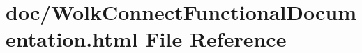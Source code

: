 \hypertarget{_wolk_connect_functional_documentation_8html}{}\section{doc/\+Wolk\+Connect\+Functional\+Documentation.html File Reference}
\label{_wolk_connect_functional_documentation_8html}

